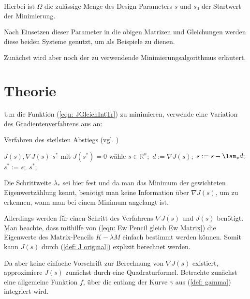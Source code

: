 \documentclass[a4paper,12pt]{report}
\newcommand{\R}{\mathbb R}
\newcommand{\1}{\mathds{1}}
\theoremstyle{plain} %
\theoremstyle{definition} %
\theoremstyle{remark}
\begin{document}
      Hierbei ist $\Omega$ die zulässige Menge des Design-Parameters $s$ und $s_0$ der Startwert der Minimierung.

      Nach Einsetzen dieser Parameter in die obigen Matrizen und Gleichungen werden diese beiden Systeme genutzt, um als Beispiele zu dienen.

      Zunächst wird aber noch der zu verwendende Minimierungsalgorithmus erläutert.
      \section{Theorie}
            Um die Funktion (\ref{eqn: JGleichIntTr}) zu minimieren, verwende eine Variation des Gradientenverfahrens aus \cite[S. 285]{optimierungBurkhard} an:
            \begin{algorithm}
                  \caption{Verfahren des steilsten Abstiegs (vgl. \cite[S. 285]{optimierungBurkhard})}
                  \label{alg: steilster Abstieg}

                  \begin{algorithmic}
                        \Require $J(s), \nabla J(s)$
                        \Ensure $s^*$ mit $J(s^*)=0$
                        \State wähle $s\in \R^n;$
                        \Repeat
                              \State $d:=\nabla J(s);$
                              \State $s:=s-\lam_*d;$
                        \State $s^*:=s;$
                        \Return $s^*;$
                  \end{algorithmic}
            \end{algorithm}

            Die Schrittweite $\lambda_*$ sei hier fest und da man das Minimum der gewichteten Eigenwertzählung kennt,
            benötigt man keine Information über $\nabla J(s)$, um zu erkennen, wann man bei einem Minimum angelangt ist.

            Allerdings werden für einen Schritt des Verfahrens $\nabla J(s)$ und $J(s)$ benötigt.
            Man beachte, dass mithilfe von (\ref{eqn: Ew Pencil gleich Ew Matrix}) die Eigenwerte des Matrix-Pencils $K-\lambda M$ einfach bestimmt werden können.
            Somit kann $J(s)$ durch (\ref{def: J original}) explizit berechnet werden.

            Da aber keine einfache Vorschrift zur Berechnung von $\nabla J(s)$ existiert, approximiere $J(s)$ zunächst durch eine Quadraturformel.
            Betrachte zunächst eine allgemeine Funktion $f$, über die entlang der Kurve $\gamma$ aus (\ref{def: gamma}) integriert wird.
\end{document}
